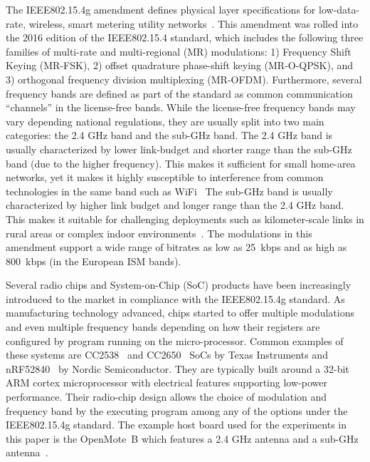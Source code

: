 \documentclass[journal,article,submit,moreauthors,pdftex]{Definitions/mdpi}
\begin{document}
The IEEE802.15.4g amendment defines physical layer specifications for low-data-rate, wireless, smart metering utility networks~\cite{std_ieee802154g}.
This amendment was rolled into the 2016 edition of the IEEE802.15.4 standard, which includes the following three families of multi-rate and multi-regional (MR) modulations: 1) Frequency Shift Keying (MR-FSK), 2) offset quadrature phase-shift keying (MR-O-QPSK), and 3) orthogonal frequency division multiplexing (MR-OFDM).
Furthermore, several frequency bands are defined as part of the standard as common communication ``channels'' in the license-free bands.
While the license-free frequency bands may vary depending national regulations, they are usually split into two main categories: the 2.4 GHz band and the sub-GHz band. 
The 2.4 GHz band is usually characterized by lower link-budget and shorter range than the sub-GHz band (due to the higher frequency). 
This makes it sufficient for small home-area networks, yet it makes it highly susceptible to interference from common technologies in the same band such as WiFi~\cite{tuset-peiro19experimental}
The sub-GHz band is usually characterized by higher link budget and longer range than the 2.4 GHz band. 
This makes it suitable for challenging deployments such as kilometer-scale links in rural areas or complex indoor environments~\cite{munoz19km}.
The modulations in this amendment support a wide range of bitrates as low as 25~kbps and as high as 800~kbps (in the European ISM bands).


Several radio chips and System-on-Chip (SoC) products have been increasingly introduced to the market in compliance with the IEEE802.15.4g standard. 
As manufacturing technology advanced, chips started to offer multiple modulations and even multiple frequency bands depending on how their registers are configured by program running on the micro-processor.
Common examples of these systems are CC2538~\cite{datasheet_cc2538} and CC2650~\cite{datasheet_cc2650} SoCs by Texas Instruments and nRF52840~\cite{datasheet_nrf52840} by Nordic Semiconductor. 
They are typically built around a 32-bit ARM cortex microprocessor with electrical features supporting low-power performance.
Their radio-chip design allows the choice of modulation and frequency band by the executing program among any of the options under the IEEE802.15.4g standard. 
The example host board used for the experiments in this paper is the OpenMote~B which features a 2.4 GHz antenna and a sub-GHz antenna~\cite{tusetopenmote}.
\end{document}
